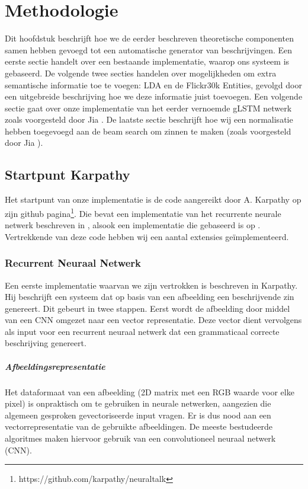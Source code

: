 \chapter{Methodologie}
Dit hoofdstuk beschrijft hoe we de eerder beschreven theoretische componenten samen hebben gevoegd tot een automatische generator van beschrijvingen. Een eerste sectie handelt over een bestaande implementatie, waarop ons systeem is gebaseerd. De volgende twee secties handelen over mogelijkheden om extra semantische informatie toe te voegen: LDA en de Flickr30k Entities, gevolgd door een uitgebreide beschrijving hoe we deze informatie juist toevoegen. Een volgende sectie gaat over onze implementatie van het eerder vernoemde gLSTM netwerk zoals voorgesteld door Jia . De laatste sectie beschrijft hoe wij een normalisatie hebben toegevoegd aan de beam search om zinnen te maken (zoals voorgesteld door Jia ).

\section{Startpunt Karpathy} 
Het startpunt van onze implementatie is de code aangereikt door A. Karpathy op zijn github pagina\footnote{https://github.com/karpathy/neuraltalk}. Die bevat een implementatie van het recurrente neurale netwerk beschreven in , alsook een implementatie die gebaseerd is op . Vertrekkende van deze code hebben wij een aantal extensies ge\"implementeerd.
\subsection{Recurrent Neuraal Netwerk}
Een eerste implementatie waarvan we zijn vertrokken is beschreven in Karpathy. Hij beschrijft een systeem dat op basis van een afbeelding een beschrijvende zin genereert. Dit gebeurt in twee stappen. Eerst wordt de afbeelding door middel van een CNN omgezet naar een vector representatie. Deze vector dient vervolgens als input voor een recurrent neuraal netwerk dat een grammaticaal correcte beschrijving genereert.

\paragraph{Afbeeldingsrepresentatie}
Het dataformaat van een afbeelding (2D matrix met een RGB waarde voor elke pixel) is onpraktisch om te gebruiken in neurale netwerken, aangezien die algemeen gesproken gevectoriseerde input vragen. Er is dus nood aan een vectorrepresentatie van de gebruikte afbeeldingen. De meeste bestudeerde algoritmes maken hiervoor gebruik van een convolutioneel neuraal netwerk (CNN).

